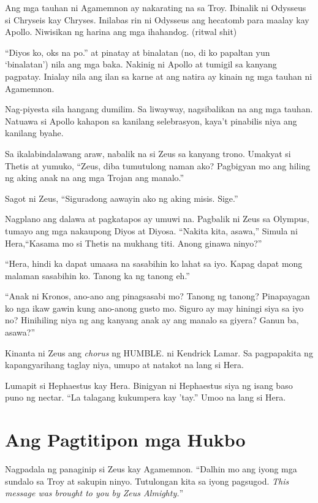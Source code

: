 \documentclass[12pt,letterpaper]{report}
\begin{document}
Ang mga tauhan ni Agamemnon ay nakarating na sa Troy. Ibinalik ni Odysseus si Chryseis kay Chryses. Inilabas rin ni Odysseus ang hecatomb para maalay kay Apollo. Niwisikan ng harina ang mga ihahandog. (ritwal shit)

``Diyos ko, oks na po.'' at pinatay at binalatan (no, di ko papaltan yun `binalatan') nila ang mga baka. Nakinig ni Apollo at tumigil sa kanyang pagpatay. Inialay nila ang ilan sa karne at ang natira ay kinain ng mga tauhan ni Agamemnon.

Nag-piyesta sila hangang dumilim. Sa liwayway, nagsibalikan na ang mga tauhan. Natuawa si Apollo kahapon sa kanilang selebrasyon, kaya't pinabilis niya ang kanilang byahe.

Sa ikalabindalawang araw, nabalik na si Zeus sa kanyang trono. Umakyat si Thetis at yumuko, ``Zeus, diba tumutulong naman ako? Pagbigyan mo ang hiling ng aking anak na ang mga Trojan ang manalo.''

Sagot ni Zeus, ``Siguradong aawayin ako ng aking misis. Sige.''

Nagplano ang dalawa at pagkatapos ay umuwi na. Pagbalik ni Zeus sa Olympus, tumayo ang mga nakaupong Diyos at Diyosa. ``Nakita kita, asawa,'' Simula ni Hera,``Kasama mo si Thetis na mukhang titi. Anong ginawa ninyo?''

``Hera, hindi ka dapat umaasa na sasabihin ko lahat sa iyo. Kapag dapat mong malaman sasabihin ko. Tanong ka ng tanong eh.''

``Anak ni Kronos, ano-ano ang pinagsasabi mo? Tanong ng tanong? Pinapayagan ko nga ikaw gawin kung ano-anong gusto mo. Siguro ay may hiningi siya sa iyo no? Hinihiling niya ng ang kanyang anak ay ang manalo sa giyera? Ganun ba, asawa?''

Kinanta ni Zeus ang \textit{chorus} ng HUMBLE. ni Kendrick Lamar. Sa pagpapakita ng kapangyarihang taglay niya, umupo at natakot na lang si Hera.

Lumapit si Hephaestus kay Hera. Binigyan ni Hephaestus siya ng isang baso puno ng nectar. ``La talagang kukumpera kay 'tay.'' Umoo na lang si Hera.

\pagebreak
\chapter{Ang Pagtitipon mga Hukbo}

Nagpadala ng panaginip si Zeus kay Agamemnon. ``Dalhin mo ang iyong mga sundalo sa Troy at sakupin ninyo. Tutulongan kita sa iyong pagsugod. \textit{This message was brought to you by Zeus Almighty.}''
\end{document}
